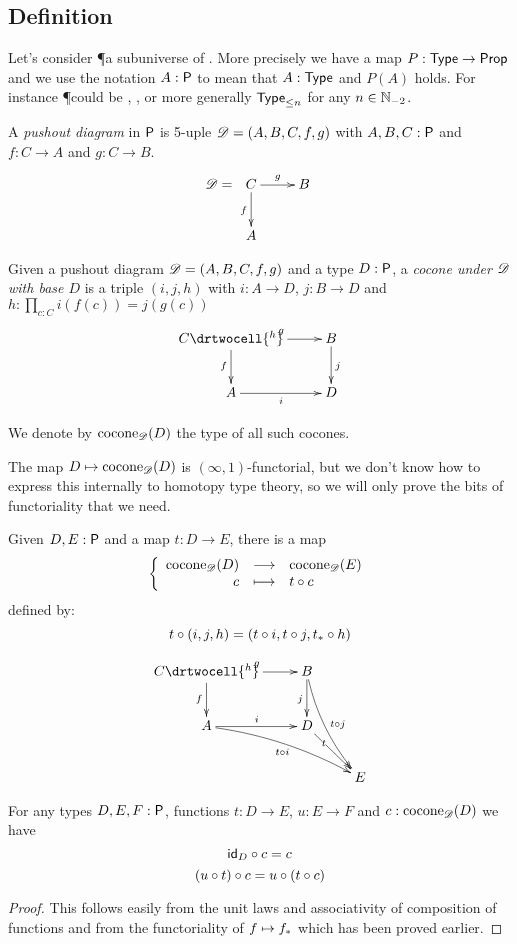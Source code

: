 \subsection{Definition}
\label{sec:push:definition}

Let’s consider \P a subuniverse of \type. More precisely we have a map
$P:\type\to\prop$ and we use the notation $A:\P$ to mean that $A:\type$ and
$P(A)$ holds. For instance \P could be \prop, \set, or more generally
$\typele{n}$ for any $n\in\Nt$.

\begin{defn}
  A \emph{pushout diagram} in $\P$ is 5-uple $\Ddiag=(A,B,C,f,g)$ with
  $A,B,C:\P$ and $f:C\to{}A$ and $g:C\to{}B$.
  \[\Ddiag=\xymatrix{C \ar^g[r] \ar_f[d] & B \\ A & }\]
\end{defn}

\begin{defn}
  Given a pushout diagram $\Ddiag=(A,B,C,f,g)$ and a type $D:\P$, a
  \emph{cocone under $\Ddiag$ with base $D$} is a triple $(i, j, h)$ with
  $i:A\to{}D$, $j:B\to{}D$ and $h : \prod_{c:C}i(f(c))=j(g(c))$
  \[\uppercurveobject{{ }}\lowercurveobject{{ }}\twocellhead{{ }}
  \xymatrix{C \ar^g[r] \ar_f[d] \drtwocell{^h} & B \ar^j[d] \\ A \ar_i[r] & D
  }\]

  We denote by $\cocone{\Ddiag}{D}$ the type of all such cocones.
\end{defn}

The map $D\mapsto\cocone{\Ddiag}{D}$ is $(\infty,1)$-functorial, but we don’t
know how to express this internally to homotopy type theory, so we will only
prove the bits of functoriality that we need.

\begin{defn}
  Given $D,E:\P$ and a map $t:D\to{}E$, there is a map
  \[\function{\cocone{\Ddiag}{D}}{\cocone{\Ddiag}{E}}{c}{\composecocone{t}c}\]
  defined by:
  \[\composecocone{t}(i,j,h)=(t\circ{}i,t\circ{}j,\mapfunc{t}\circ{}h)\]

  \[\uppercurveobject{{ }}\lowercurveobject{{ }}\twocellhead{{ }}
  \xymatrix{C \ar^g[r] \ar_f[d] \drtwocell{^h} & B \ar_j[d]
    \ar@/_/^{t\circ{}j}[rdd] & \\
    A \ar^i[r] \ar@/^/_{t\circ{}i}[rrd] & D \ar[rd]|<<<<t & \\
    & & E }\]
\end{defn}

\begin{lem}
  For any types $D,E,F:\P$, functions $t:D\to{}E$, $u:E\to{}F$ and
  $c:\cocone{\Ddiag}{D}$ we have
  \[\composecocone{\idfunc[D]}c = c\]
  \[\composecocone{(u\circ{}t)}c=\composecocone{u}(\composecocone{t}c)\]
\end{lem}
\begin{proof}
  This follows easily from the unit laws and associativity of composition of
  functions and from the functoriality of $f\mapsto{}\mapfunc{f}$ which has been proved
  earlier.
\end{proof}

